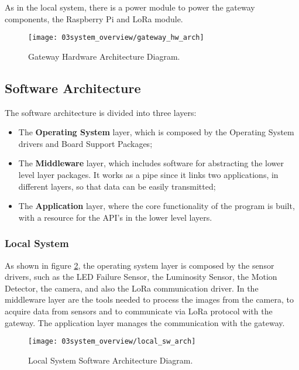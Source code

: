 As in the local system, there is a power module to power the gateway components, the Raspberry Pi and LoRa module.

\begin{figure}[H]
	\centering
	\texttt{[image: 03system\_overview/gateway\_hw\_arch]}
	\caption{Gateway Hardware Architecture Diagram.}
	\label{fig:gateway_hw_arch}
\end{figure}

\subsection{Software Architecture}
The software architecture is divided into three layers:
\begin{itemize}
        \item The \textbf{Operating System} layer, which is composed by the Operating System drivers and Board Support Packages;
        \item The \textbf{Middleware} layer, which includes software for abstracting the lower level layer packages. It works as a pipe since it links two applications, in different layers, so that data can be easily transmitted;
        \item The \textbf{Application} layer, where the core functionality of the program is built, with a resource for the API's in the lower level layers.
\end{itemize}

\clearpage
\subsubsection{Local System}

As shown in figure \ref{fig:local_sw_arch}, the operating system layer is composed by the sensor drivers, such as the LED Failure Sensor, the Luminosity Sensor, the Motion Detector, the camera, and also the LoRa communication driver. In the middleware layer are the tools needed to process the images from the camera, to acquire data from sensors and to communicate via LoRa protocol with the gateway. The application layer manages the communication with the gateway.

\begin{figure}[H]
	\centering
	\texttt{[image: 03system\_overview/local\_sw\_arch]}
	\caption{Local System Software Architecture Diagram.}
	\label{fig:local_sw_arch}
\end{figure}

\clearpage
